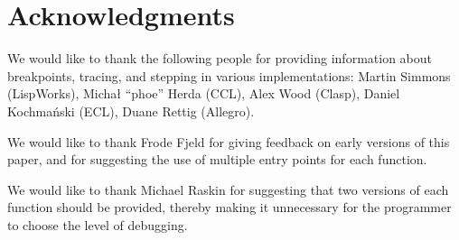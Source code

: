 \section{Acknowledgments} 

We would like to thank the following people for providing information
about breakpoints, tracing, and stepping in various \commonlisp{}
implementations: Martin Simmons (LispWorks), Michał ``phoe'' Herda
(CCL), Alex Wood (Clasp), Daniel Kochmański (ECL), Duane Rettig
(Allegro).

We would like to thank Frode Fjeld for giving feedback on early
versions of this paper, and for suggesting the use of multiple entry
points for each function.

We would like to thank Michael Raskin for suggesting that two versions
of each function should be provided, thereby making it unnecessary for
the programmer to choose the level of debugging.
